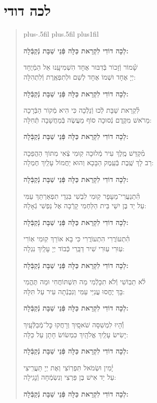 \documentclass[twoside, openany, parskip=half, 11pt]{book}
\begin{document}
\section*{ לכה דודי }

\newcommand{\lechadodi}{\textbf{לְכָה דוֹדִי לִקְרַאת כַּלָּה פְּֿנֵי שַׁבָּת נְֿקַבְּֿלָה:}}

\begin{quote}
 \leftskip=0pt plus-.5fil
 \rightskip=0pt plus.5fil
 \parfillskip=0pt plus1fil


\lechadodi

 שָׁ֗מוֹר וְֿזָכוֹר בְּֿדִבּוּר אֶחָד \hfill
הִשְׁמִיעָֽנוּ אֵל הַמְֿיֻחָד \\
יְיָ אֶחָד וּשְׁמוֹ אֶחָד \hfill
לְשֵׁם וּלְתִפְאֶֽרֶת וְֿלִתְהִלָּה:

\lechadodi

 לִ֗קְרַאת שַׁבָּת לְֿכוּ וְֿנֵלְֿכָה \hfill
כִּי הִיא מְֿקוֹר הַבְּֿרָכָה \\
מֵרֹאשׁ מִקֶּֽדֶם נְֿסוּכָה \hfill
סוֹף מַעֲשֶׂה בְּֿמַחֲשָׁבָה תְּֿחִלָּה:

\lechadodi

 מִ֗קְדַּשׁ מֶֽלֶךְ עִיר מְֿלוּכָה \hfill
קֽוּמִי צְֿאִי מִתּוֹךְ הַהֲפֵכָה \\
רַב לָךְ שֶֽׁבֶת בְּֿעֵֽמֶק הַבָּכָא \hfill
וְהוּא יַחֲמוֹל עָלַֽיִךְ חֶמְלָה:

\lechadodi

 הִ֗תְנַעֲרִי־מֵעָפָר קֽוּמִי \hfill
לִבְשִׁי בִּגְדֵי תִפְאַרְתֵּךְ עַמִּי \\
עַל יַד בֶּן יִשַׁי בֵּית הַלַּחְמִי \hfill
קָרְֿבָה אֶל נַפְשִׁי גְֿאָלָהּ:

\lechadodi

 הִ֗תְעוֹרֲרִי הִתְעוֹרֲרִי \hfill
כִּי בָא אוֹרֵךְ קֽוּמִי אֽוֹרִי \\
עֽוּרִי עֽוּרִי שִׁיר דַבֵּֽרִי \hfill
כְּֿבוֹד יְיָ עָלַֽיִךְ נִגְלָה:

\lechadodi

 לֹ֗א תֵבֽוֹשִׁי וְֿלֹא תִכָּלְֿמִי \hfill
מַה תִּשְׁתּוֹחֲחִי וּמַה תֶּהֱמִי \\
בָּךְ יֶחֱסוּ עֲנִיֵּי עַמִּי \hfill
וְנִבְנְֿתָה עִיר עַל תִּלָּהּ:

\lechadodi

 וְֿ֗הָיוּ לִמְשִׁסָּה שֹׁאסָֽיִךְ \hfill
וְרָחֲקוּ כׇּל־מְֿבַלְּֿעָֽיִךְ \\
יָשִׂישׂ עָלַֽיִךְ אֱלֹהָֽיִךְ \hfill
כִּמְשׂוֹשׂ חָתָן עַל כַּלָּה:

\lechadodi

 יָ֗מִין וּשְׂמֹאל תִּפְרֽוֹצִי \hfill
וְאֶת יְיָ תַּעֲרִֽיצִי \\
עַל יַד אִישׁ בֶּן פַּרְצִי \hfill
וְנִשְׂמְֿחָה וְֿנָגִֽילָה:

\lechadodi

\end{quote}
\end{document}
